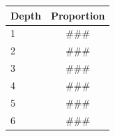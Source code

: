 \begin{tabular}{lc}
\toprule
Depth & Proportion \\
\midrule
1 & ### \\
2 & ### \\
3 & ### \\
4 & ### \\
5 & ### \\
6 & ### \\
\bottomrule
\end{tabular}
